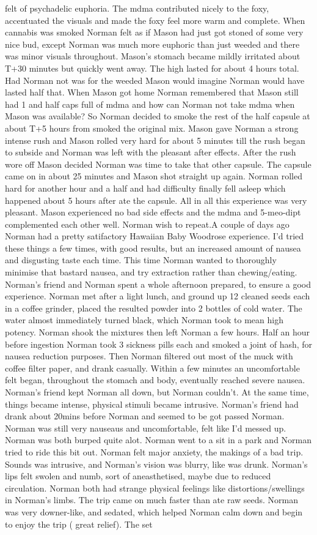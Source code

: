 \documentclass[12pt]{book}
\begin{document}
felt of psychadelic euphoria. The mdma contributed nicely to the foxy, accentuated the visuals and made the foxy feel more warm and complete. When cannabis was smoked Norman felt as if Mason had just got stoned of some very nice bud, except Norman was much more euphoric than just weeded and there was minor visuals throughout. Mason's stomach became mildly irritated about T+30 minutes but quickly went away. The high lasted for about 4 hours total. Had Norman not was for the weeded Mason would imagine Norman would have lasted half that. When Mason got home Norman remembered that Mason still had 1 and half caps full of mdma and how can Norman not take mdma when Mason was available? So Norman decided to smoke the rest of the half capsule at about T+5 hours from smoked the original mix. Mason gave Norman a strong intense rush and Mason rolled very hard for about 5 minutes till the rush began to subside and Norman was left with the pleasant after effects. After the rush wore off Mason decided Norman was time to take that other capsule. The capsule came on in about 25 minutes and Mason shot straight up again. Norman rolled hard for another hour and a half and had difficulty finally fell asleep which happened about 5 hours after ate the capsule. All in all this experience was very pleasant. Mason experienced no bad side effects and the mdma and 5-meo-dipt complemented each other well. Norman wish to repeat.A couple of days ago Norman had a pretty satifactory Hawaiian Baby Woodrose experience. I'd tried these things a few times, with good results, but an increased amount of nausea and disgusting taste each time. This time Norman wanted to thoroughly minimise that bastard nausea, and try extraction rather than chewing/eating. Norman's friend and Norman spent a whole afternoon prepared, to ensure a good experience. Norman met after a light lunch, and ground up 12 cleaned seeds each in a coffee grinder, placed the resulted powder into 2 bottles of cold water. The water almost immediately turned black, which Norman took to mean high potency. Norman shook the mixtures then left Norman a few hours. Half an hour before ingestion Norman took 3 sickness pills each and smoked a joint of hash, for nausea reduction purposes. Then Norman filtered out most of the muck with coffee filter paper, and drank casually. Within a few minutes an uncomfortable felt began, throughout the stomach and body, eventually reached severe nausea. Norman's friend kept Norman all down, but Norman couldn't. At the same time, things became intense, physical stimuli became intrusive. Norman's friend had drank about 20mins before Norman and seemed to be got passed Norman. Norman was still very nauseaus and uncomfortable, felt like I'd messed up. Norman was both burped quite alot. Norman went to a sit in a park and Norman tried to ride this bit out. Norman felt major anxiety, the makings of a bad trip. Sounds was intrusive, and Norman's vision was blurry, like was drunk. Norman's lips felt swolen and numb, sort of aneasthetised, maybe due to reduced circulation. Norman both had strange physical feelings like distortions/swellings in Norman's limbs. The trip came on much faster than ate raw seeds. Norman was very downer-like, and sedated, which helped Norman calm down and begin to enjoy the trip ( great relief). The set 
\end{document}
